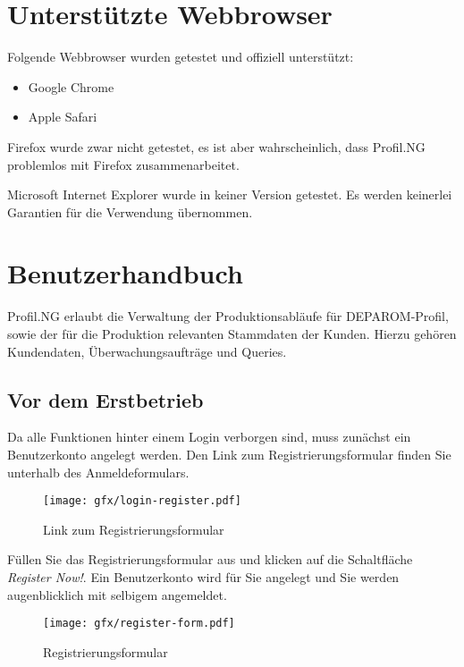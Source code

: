 \section{Unterstützte Webbrowser}

Folgende Webbrowser wurden getestet und offiziell unterstützt:

\begin{itemize}
  \item{Google Chrome}
  \item{Apple Safari}
\end{itemize}

Firefox wurde zwar nicht getestet, es ist aber wahrscheinlich, dass
Profil.NG problemlos mit Firefox zusammenarbeitet.

Microsoft Internet Explorer wurde in keiner Version getestet. Es werden
keinerlei Garantien für die Verwendung übernommen.


\section{Benutzerhandbuch}

Profil.NG erlaubt die Verwaltung der Produktionsabläufe für DEPAROM-Profil,
sowie der für die Produktion relevanten Stammdaten der Kunden. Hierzu gehören
Kundendaten, Überwachungsaufträge und Queries.

\subsection{Vor dem Erstbetrieb}

Da alle Funktionen hinter einem Login verborgen sind, muss zunächst ein
Benutzerkonto angelegt werden. Den Link zum Registrierungsformular finden Sie
unterhalb des Anmeldeformulars.

\begin{figure}[H]
  \texttt{[image: gfx/login-register.pdf]}
  \caption{Link zum Registrierungsformular}
  \label{fig:login-register}
\end{figure}

Füllen Sie das Registrierungsformular aus und klicken auf die Schaltfläche
\textit{Register Now!}. Ein Benutzerkonto wird für Sie angelegt und Sie werden
augenblicklich mit selbigem angemeldet.

\begin{figure}[H]
  \texttt{[image: gfx/register-form.pdf]}
  \caption{Registrierungsformular}
  \label{fig:register-form}
\end{figure}

